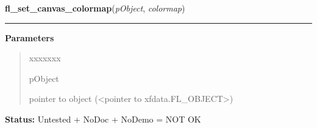     \label{xformslib:library:fl_set_canvas_colormap}

    \vspace{0.5ex}

\hspace{.8\funcindent}\begin{boxedminipage}{\funcwidth}

    \raggedright \textbf{fl\_set\_canvas\_colormap}(\textit{pObject}, \textit{colormap})

    \vspace{-1.5ex}

    \rule{\textwidth}{0.5\fboxrule}
\setlength{\parskip}{2ex}
\setlength{\parskip}{1ex}
      \textbf{Parameters}
      \vspace{-1ex}

      \begin{quote}
        \begin{Ventry}{xxxxxxx}

          \item[pObject]

          pointer to object ({\textless}pointer to 
          xfdata.FL\_OBJECT{\textgreater})

        \end{Ventry}

      \end{quote}

\textbf{Status:} Untested + NoDoc + NoDemo = NOT OK



    \end{boxedminipage}

    \label{xformslib:library:fl_set_canvas_visual}

    \vspace{0.5ex}

